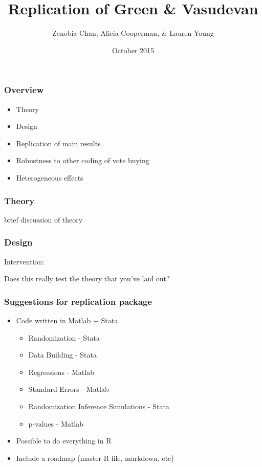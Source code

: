 \documentclass{beamer}
\institute{Columbia University}
\begin{document}
\title[SSDS]{Replication of Green \& Vasudevan}
\author{Zenobia Chan, Alicia Cooperman, \& Lauren Young}
\date{October 2015}

\begin{frame}
\titlepage
\end{frame}



\begin{frame}
\frametitle{Overview}

\begin{itemize}
\item Theory
\item Design
\item Replication of main results
\item Robustness to other coding of vote buying
\item Heterogeneous effects
\end{itemize}

\end{frame}


\begin{frame}
\frametitle{Theory}

brief discussion of theory

\end{frame}


\begin{frame}
\frametitle{Design}

Intervention:

Does this really test the theory that you've laid out?

\end{frame}



\begin{frame}
\frametitle{Suggestions for replication package}

\begin{itemize}
\item Code written in Matlab + Stata
\begin{itemize}
\item Randomization - Stata
\item Data Building - Stata
\item Regressions - Matlab
\item Standard Errors - Matlab
\item Randomization Inference Simulations - Stata
\item p-values - Matlab
\end{itemize}
\item Possible to do everything in R
\item Include a roadmap (master R file, markdown, etc)
\end{itemize}

\end{frame}
\end{document}
